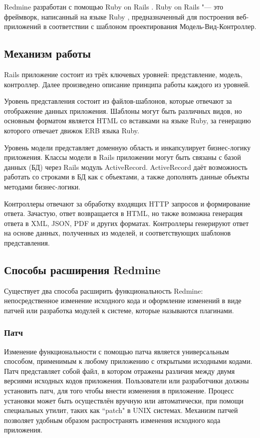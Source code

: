 Redmine разработан с помощью Ruby on Rails \cite{rails}. Ruby on
Rails "--- это фреймворк, написанный на языке Ruby \cite{ruby}, предназначенный
для построения веб-приложений в соответствии с шаблоном проектирования
Модель-Вид-Контроллер. 

\subsection{Механизм работы}
Rails приложение состоит из трёх ключевых уровней: представление, модель,
контроллер. Далее произведено описание принципа работы каждого из уровней.

Уровень представления состоит из файлов-шаблонов, которые отвечают за
отображение данных приложения. Шаблоны могут быть различных видов, но основным
форматом является HTML со вставками на языке Ruby, за генерацию которого
отвечает движок ERB языка Ruby.

Уровень модели представляет доменную область и инкапсулирует бизнес-логику
приложения. Классы модели в Rails приложении могут быть связаны с базой данных
(БД) через Rails модуль ActiveRecord. ActiveRecord даёт возможность работать со
строками в БД как с объектами, а также дополнять данные объекты методами
бизнес-логики.

Контроллеры отвечают за обработку входящих HTTP запросов и формирование ответа.
Зачастую, ответ возвращается в HTML, но также возможна генерация ответа в XML,
JSON, PDF и других форматах. Контроллеры генерируют ответ на основе данных,
полученных из моделей, и соответствующих шаблонов представления.

\subsection{Способы расширения Redmine}
Существует два способа расширить функциональность Redmine: непосредственное
изменение исходного кода и оформление изменений в виде патчей или разработка 
модулей к системе, которые называются плагинами.

\subsubsection{Патч}
Изменение функциональности с помощью патча является универсальным способом,
применимым к любому приложению с открытыми исходными кодами. Патч представляет
собой файл, в котором отражены различия между двумя версиями исходных кодов
приложения. Пользователи или разработчики должны установить патч, для того
чтобы внести изменения в приложение. Процесс установки может быть осуществлён
вручную или автоматически, при помощи специальных утилит, таких как ``patch" в
UNIX системах. Механизм патчей позволяет удобным образом распространять
изменения исходного кода приложения.

